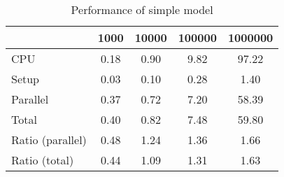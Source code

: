 \begin{table}[!h]
\centering
\caption{Performance of simple model}
\begin{tabular}{l*{4}{c}}\hline
& 1000 &           10000 &          100000 &         1000000 \\ \hline
CPU &     0.18 &      0.90 &      9.82 &     97.22 \\
Setup &     0.03 &      0.10 &      0.28 &      1.40 \\
Parallel &     0.37 &      0.72 &      7.20 &     58.39 \\
Total &     0.40 &      0.82 &      7.48 &     59.80 \\
Ratio (parallel) &     0.48 &      1.24 &      1.36 &      1.66 \\
Ratio (total) &     0.44 &      1.09 &      1.31 &      1.63 \\
\hline
\end{tabular}
\end{table}
